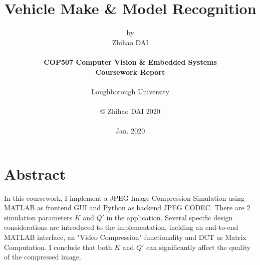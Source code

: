 \title{\bf Vehicle Make \& Model Recognition}

\author{by\\Zhihao DAI\\
\\
{\bf COP507 Computer Vision \& Embedded Systems}\\
{\bf Coursework Report}\\
\\
Loughborough University\\
\\
\copyright
\hspace{1 dd} Zhihao DAI 2020\\
\\
Jan. 2020
}
\date{} %

\maketitle


% 
% 

\chapter*{Abstract}
In this coursework, I implement a JPEG Image Compression Simulation using MATLAB as frontend GUI and Python as backend JPEG CODEC. There are 2 simulation parameters $K$ and $Q'$ in the application. 
Several specific design considerations are introduced to the implementation, inclding an end-to-end MATLAB interface, an "Video Compression" functionality and DCT as Matrix Computation.
I conclude that both $K$ and $Q'$ can significantly affect the quality of the compressed image.



